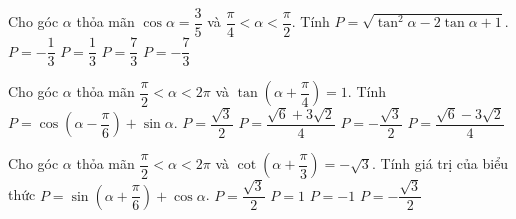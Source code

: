 \begin{ex}%
Cho góc $\alpha $ thỏa mãn $\cos \alpha =\dfrac{3}{5}$ và $\dfrac{\pi}{4}<\alpha <\dfrac{\pi}{2}$. Tính $P=\sqrt{{{\tan}^2\alpha-2\tan \alpha+1}}$.
\choice
{$P=-\dfrac{1}{3}$}
{\True $P=\dfrac{1}{3}$}
{$P=\dfrac{7}{3}$}
{$P=-\dfrac{7}{3}$}
\end{ex}

\begin{ex}%
Cho góc $\alpha $ thỏa mãn $\dfrac{\pi}{2}<\alpha <2\pi $ và $\tan \left({\alpha+\dfrac{\pi}{4}}\right)=1$. Tính $P=\cos \left({\alpha-\dfrac{\pi}{6}}\right)+\sin \alpha $.
\choice
{$P=\dfrac{{\sqrt{3}}}{2}$}
{$P=\dfrac{{\sqrt{6}+3\sqrt{2}}}{4}$}
{\True $P=-\dfrac{{\sqrt{3}}}{2}$}
{$P=\dfrac{{\sqrt{6}-3\sqrt{2}}}{4}$}
\end{ex}

\begin{ex}%
Cho góc $\alpha $ thỏa mãn $\dfrac{\pi}{2}<\alpha <2\pi $ và $\cot \left({\alpha+\dfrac{\pi}{3}}\right)=-\sqrt{3}$. Tính giá trị của biểu thức $P=\sin \left({\alpha+\dfrac{\pi}{6}}\right)+\cos \alpha $.
\choice
{$P=\dfrac{{\sqrt{3}}}{2}$}
{$P=1$}
{$P=-1$}
{$P=-\dfrac{{\sqrt{3}}}{2}$}
\end{ex}

